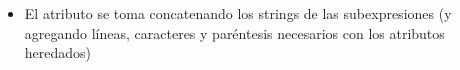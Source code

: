 \begin{itemize}
	\item El atributo \textbf{} se toma concatenando los strings de las subexpresiones (y agregando líneas, caracteres y paréntesis necesarios con los atributos heredados)

\end{itemize}
